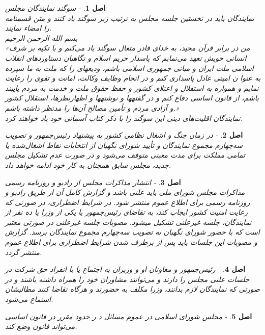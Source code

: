\documentclass[12pt]{article}
\newtheorem{asl}{اصل}
\begin{document}
\begin{asl}- 
سوگند نمایندگان مجلس
\\
نمایندگان باید در نخستین جلسه مجلس به ترتیب زیر سوگند یاد کنند و متن قسم‏نامه را امضاء نمایند. 
\\
بسم الله الرحمن الرحیم
\\
«من در برابر قرآن مجید، به خدای قادر متعال سوگند یاد می‌کنم و با تکیه بر شرف انسانی خویش تعهد می‌نمایم که پاسدار حریم اسلام و نگاهبان دستاوردهای انقلاب اسلامی ملت ایران و مبانی جمهوری اسلامی باشم، ودیعه‏ای را که ملت به ما سپرده به عنوا ن امینی عادل پاسداری کنم و در انجام وظایف وکالت، امانت و تقوی را رعایت نمایم و همواره به استقلال و اعتلای کشور و حفظ حقوق ملت و خدمت به مردم پایبند باشم، از قانون اساسی دفاع کنم و در گفته‏ها و نوشته‏ها و اظهارنظرها، استقلال کشور و آزادی مردم و تأمین مصالح آن‌ها را مدنظر داشته باشم.»
\\
نمایندگان اقلیت‌های دینی این سوگند را با ذکر کتاب آسمانی خود یاد خواهند کرد.

\end{asl}

\begin{asl}- 
در زمان جنگ و اشغال نظامی کشور به پیشنهاد رئیس‌جمهور و تصویب سه‌چهارم مجموع نمایندگان و تأیید شورای نگهبان از انتخابات نقاط اشغال‌شده یا تمامی مملکت برای مدت معینی متوقف می‌شود و در صورت عدم تشکیل مجلس جدید، مجلس سابق همچنان به کار خود ادامه خواهد داد. 
\end{asl}

\begin{asl}- 
انتشار مذاکرات مجلس از رادیو و روزنامه رسمی 
\\
مذاکرات مجلس شورای ملی باید علنی باشد و گزارش کامل آن از طریق رادیو و روزنامه رسمی برای اطلاع عموم منتشر شود. در شرایط اضطراری، در صورتی که رعایت امنیت کشور ایجاب کند، به تقاضای رئیس‌جمهور یا یکی از وزرا یا ده نفر از نمایندگان، جلسه غیرعلنی تشکیل می‏شود. مصوبات جلسه غیرعلنی در صورتی معتبر است که با حضور شورای نگهبان به تصویب سه‌چهارم مجموع نمایندگان برسد. گزارش و مصوبات این جلسات باید پس از برطرف شدن شرایط اضطراری برای اطلاع عموم منتشر گردد. 

\end{asl}

\begin{asl}- 
رئیس‌جمهور و معاونان او و وزیران به اجتماع یا با انفراد حق شرکت در جلسات علنی مجلس را دارند و می‌توانند مشاوران خود را همراه داشته باشند و در صورتی که نمایندگان لازم بدانند، وزرا مکلف به حضورند و هرگاه تقاضا کنند مطالبشان استماع می‌شود. 
\end{asl}

\begin{asl}- 
مجلس شورای اسلامی در عموم مسائل د ر حدود مقرر در قانون اساسی می‌تواند قانون وضع کند. 
\end{asl}
\end{document}
